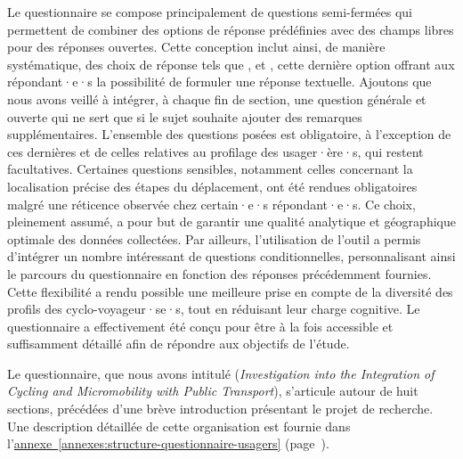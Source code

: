 \begin{refsegment}
Le questionnaire se compose principalement de questions semi-fermées qui permettent de combiner des options de réponse prédéfinies avec des champs libres pour des réponses ouvertes. Cette conception inclut ainsi, de manière systématique, des choix de réponse tels que ,  et , cette dernière option offrant aux répondant·e·s la possibilité de formuler une réponse textuelle. Ajoutons que nous avons veillé à intégrer, à chaque fin de section, une question générale et ouverte qui ne sert que si le sujet souhaite ajouter des remarques supplémentaires. L’ensemble des questions posées est obligatoire, à l’exception de ces dernières et de celles relatives au profilage des usager·ère·s, qui restent facultatives. Certaines questions sensibles, notamment celles concernant la localisation précise des étapes du déplacement, ont été rendues obligatoires malgré une réticence observée chez certain·e·s répondant·e·s. Ce choix, pleinement assumé, a pour but de garantir une qualité analytique et géographique optimale des données collectées. Par ailleurs, l’utilisation de l’outil  a permis d’intégrer un nombre intéressant de questions conditionnelles, personnalisant ainsi le parcours du questionnaire en fonction des réponses précédemment fournies. Cette flexibilité a rendu possible une meilleure prise en compte de la diversité des profils des cyclo-voyageur·se·s, tout en réduisant leur charge cognitive. Le questionnaire a effectivement été conçu pour être à la fois accessible et suffisamment détaillé afin de répondre aux objectifs de l’étude.%

Le questionnaire, que nous avons intitulé 
(\textsl{Investigation into the Integration of Cycling and Micromobility with Public Transport}), s'articule autour de huit sections, précédées d'une brève introduction présentant le projet de recherche. Une description détaillée de cette organisation est fournie dans l'\hyperref[annexes:structure-questionnaire-usagers]{annexe~\ref{annexes:structure-questionnaire-usagers}} (page~\pageref{annexes:structure-questionnaire-usagers}).%


\end{refsegment}

